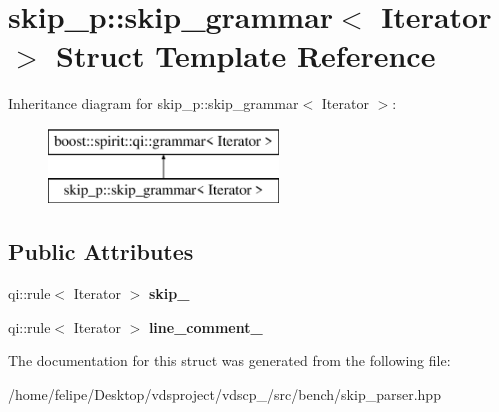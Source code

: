 \section{skip\+\_\+p\+:\+:skip\+\_\+grammar$<$ Iterator $>$ Struct Template Reference}
\label{structskip__p_1_1skip__grammar}
Inheritance diagram for skip\+\_\+p\+:\+:skip\+\_\+grammar$<$ Iterator $>$\+:\begin{figure}[H]
\begin{center}
\leavevmode
\includegraphics[height=2.000000cm]{structskip__p_1_1skip__grammar}
\end{center}
\end{figure}
\subsection*{Public Attributes}
\begin{DoxyCompactItemize}
\item 
qi\+::rule$<$ Iterator $>$ {\bfseries skip\+\_\+}\label{structskip__p_1_1skip__grammar_ae0feb7886ff25cd5363083242bb41239}

\item 
qi\+::rule$<$ Iterator $>$ {\bfseries line\+\_\+comment\+\_\+}\label{structskip__p_1_1skip__grammar_a1cf07ff2e793ae00e4181b23ea9ace2c}

\end{DoxyCompactItemize}


The documentation for this struct was generated from the following file\+:\begin{DoxyCompactItemize}
\item 
/home/felipe/\+Desktop/vdsproject/vdscp\+\_/src/bench/skip\+\_\+parser.\+hpp\end{DoxyCompactItemize}
